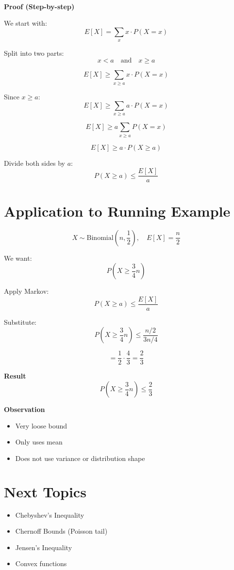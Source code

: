 \documentclass[12pt]{article}
\begin{document}
\textbf{Proof (Step-by-step)}

We start with:
\[
E[X] = \sum_x x \cdot P(X = x)
\]

Split into two parts:
\[
x < a \quad \text{and} \quad x \geq a
\]

\[
E[X] \geq \sum_{x \geq a} x \cdot P(X = x)
\]

Since $x \geq a$:
\[
E[X] \geq \sum_{x \geq a} a \cdot P(X = x)
\]

\[
E[X] \geq a \sum_{x \geq a} P(X = x)
\]

\[
E[X] \geq a \cdot P(X \geq a)
\]

Divide both sides by $a$:
\[
P(X \geq a) \leq \frac{E[X]}{a}
\]

\section{Application to Running Example}

\[
X \sim \text{Binomial}\left(n, \frac{1}{2}\right), \quad E[X] = \frac{n}{2}
\]

We want:
\[
P\left(X \geq \frac{3}{4}n\right)
\]

Apply Markov:
\[
P(X \geq a) \leq \frac{E[X]}{a}
\]

Substitute:
\[
P\left(X \geq \frac{3}{4}n\right) \leq \frac{n/2}{3n/4}
\]

\[
= \frac{1}{2} \cdot \frac{4}{3} = \frac{2}{3}
\]

\textbf{Result}
\[
P\left(X \geq \frac{3}{4}n\right) \leq \frac{2}{3}
\]

\textbf{Observation}
\begin{itemize}
    \item Very loose bound
    \item Only uses mean
    \item Does not use variance or distribution shape
\end{itemize}

\section*{Next Topics}

\begin{itemize}
    \item Chebyshev’s Inequality
    \item Chernoff Bounds (Poisson tail)
    \item Jensen’s Inequality
    \item Convex functions
\end{itemize}
\end{document}
